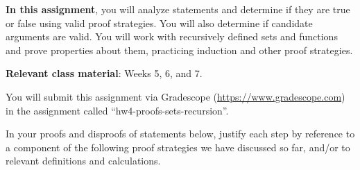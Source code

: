 {\bf In this assignment}, you will analyze statements and determine if they are true or false using valid proof strategies.
You will also determine if candidate arguments are valid.
You will work with recursively defined sets and functions and prove 
properties about them, practicing induction and other proof strategies.


{\bf Relevant class material}: Weeks 5, 6, and 7.

You will submit this assignment via Gradescope
(\href{https://www.gradescope.com}{https://www.gradescope.com}) 
in the assignment called ``hw4-proofs-sets-recursion''.

\instructions

In your proofs and disproofs of statements below, justify each  step
by reference to  a component of the  following proof  strategies
we  have discussed so far, and/or to relevant definitions and calculations.

\vspace{-10pt}

